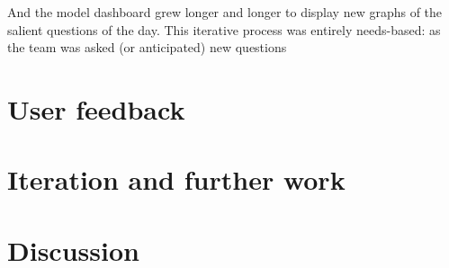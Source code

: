 And the model dashboard grew longer and longer to display new graphs of
the salient questions of the day. This iterative process was entirely
needs-based: as the team was asked (or anticipated) new questions

\hypertarget{user-feedback}{%
\section{User feedback}\label{user-feedback}}

\hypertarget{iteration-and-further-work}{%
\section{Iteration and further work}\label{iteration-and-further-work}}

\hypertarget{discussion}{%
\section{Discussion}\label{discussion}}
